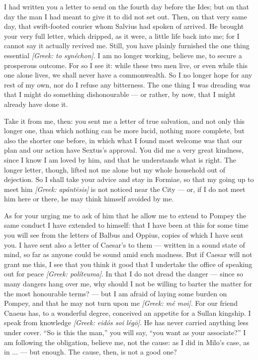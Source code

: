

 I had written you a letter to send on the fourth day before the Ides; but on that day the man I had meant to give it to did not set out. Then, on that very same day, that swift-footed courier whom Salvius had spoken of arrived. He brought your very full letter, which dripped, as it were, a little life back into me; for I cannot say it actually revived me. Still, you have plainly furnished the one thing essential \textit{[Greek: to syn\'echon]}. I am no longer working, believe me, to secure a prosperous outcome. For so I see it: while these two men live, or even while this one alone lives, we shall never have a commonwealth. So I no longer hope for any rest of my own, nor do I refuse any bitterness. The one thing I was dreading was that I might do something dishonourable --- or rather, by now, that I might already have done it.

 Take it from me, then: you sent me a letter of true salvation, and not only this longer one, than which nothing can be more lucid, nothing more complete, but also the shorter one before, in which what I found most welcome was that our plan and our action have Sextus's approval. You did me a very great kindness, since I know I am loved by him, and that he understands what is right. The longer letter, though, lifted not me alone but my whole household out of dejection. So I shall take your advice and stay in Formiae, so that my going up to meet him \textit{[Greek: ap\'ant\=esis]} is not noticed near the City --- or, if I do not meet him here or there, he may think himself avoided by me.

 As for your urging me to ask of him that he allow me to extend to Pompey the same conduct I have extended to himself: that I have been at this for some time you will see from the letters of Balbus and Oppius, copies of which I have sent you. I have sent also a letter of Caesar's to them --- written in a sound state of mind, so far as anyone could be sound amid such madness. But if Caesar will not grant me this, I see that you think it good that I undertake the office of speaking out for peace \textit{[Greek: pol\'iteuma]}. In that I do not dread the danger --- since so many dangers hang over me, why should I not be willing to barter the matter for the most honourable terms? --- but I am afraid of laying some burden on Pompey, and that he may not turn upon me \textit{[Greek: m\'e moi]}. For our friend Cnaeus has, to a wonderful degree, conceived an appetite for a Sullan kingship. I speak from knowledge \textit{[Greek: eid\'os soi l\'eg\=o]}. He has never carried anything less under cover. ``So is this the man,'' you will say, ``you want as your associate?'' I am following the obligation, believe me, not the cause: as I did in Milo's case, as in $\ldots$ --- but enough. The cause, then, is not a good one?

